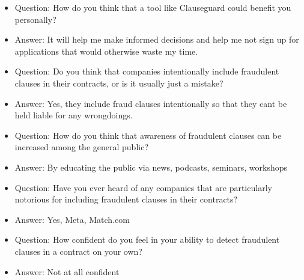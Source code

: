 \begin{itemize}
    \item Question: How do you think that a tool like Clauseguard could benefit you personally?

    \item Answer: It will help me make informed decisions and help me not sign up for applications that would otherwise waste my time. 

    \item Question: Do you think that companies intentionally include fraudulent clauses in their contracts, or is it usually just a mistake?

    \item Answer: Yes, they include fraud clauses intentionally so that they cant be held liable for any wrongdoings. 

    \item Question: How do you think that awareness of fraudulent clauses can be increased among the general public?

    \item Answer: By educating the public via news, podcasts, seminars, workshops

    \item Question: Have you ever heard of any companies that are particularly notorious for including fraudulent clauses in their contracts?

    \item Answer: Yes, Meta, Match.com

    \item Question: How confident do you feel in your ability to detect fraudulent clauses in a contract on your own?

    \item Answer: Not at all confident 

    
\end{itemize}


